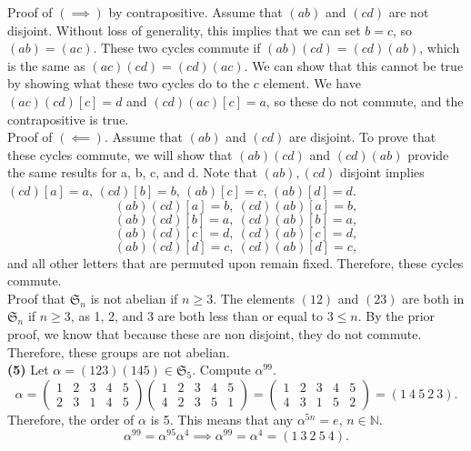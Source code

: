 \documentclass[12pt,letterpaper]{article}
\begin{document}
Proof of \((\implies)\) by contrapositive. Assume that \((ab)\) and \((cd)\) are not disjoint. Without loss of generality, this implies that we can set \(b = c\), so \((ab) = (ac)\). These two cycles commute if \((ab)(cd) = (cd)(ab)\), which is the same as \((ac)(cd) = (cd)(ac)\). We can show that this cannot be true by showing what these two cycles do to the \(c\) element. We have \((ac)(cd)[c] = d\) and \((cd)(ac)[c] = a\), so these do not commute, and the contrapositive is true. \\

Proof of \((\impliedby)\). Assume that \((ab)\) and \((cd)\) are disjoint. To prove that these cycles commute, we will show that \((ab)(cd)\) and \((cd)(ab)\) provide the same results for a, b, c, and d. Note that \((ab),(cd)\) disjoint implies \((cd)[a] = a\), \((cd)[b] = b\), \((ab)[c] = c\), \((ab)[d] = d\). \[(ab)(cd)[a] = b,\ (cd)(ab)[a] = b,\]\[(ab)(cd)[b] = a,\ (cd)(ab)[b] = a,\]\[(ab)(cd)[c] = d,\ (cd)(ab)[c] = d,\]\[(ab)(cd)[d] = c,\ (cd)(ab)[d] = c,\] and all other letters that are permuted upon remain fixed. Therefore, these cycles commute. \\

Proof that \(\mathfrak{S}_{n}\) is not abelian if \(n \geq 3.\) The elements \((12)\) and \((23)\) are both in \(\mathfrak{S}_{n}\) if \(n \geq 3\), as 1, 2, and 3 are both less than or equal to \(3 \leq n\). By the prior proof, we know that because these are non disjoint, they do not commute. Therefore, these groups are not abelian. \\

\textbf{(5)} Let \(\alpha = (123)(145) \in \mathfrak{S}_{5}.\) Compute \(\alpha^{99}\).\\

\[\alpha = \begin{pmatrix} 1 & 2 & 3 & 4 & 5 \\ 2 & 3 & 1 & 4 & 5 \end{pmatrix} \begin{pmatrix} 1 & 2 & 3 & 4 & 5 \\ 4 & 2 & 3 & 5 & 1\end{pmatrix} = \begin{pmatrix} 1 & 2 & 3 & 4 & 5 \\ 4 & 3 & 1 & 5 & 2 \end{pmatrix} = (1\ 4\ 5\ 2\ 3).\] Therefore, the order of \(\alpha\) is 5. This means that any \(\alpha^{5n}=e\), \(n \in \mathbb{N}\). \[\alpha^{99} = \alpha^{95}\alpha^{4} \implies \alpha^{99} = \alpha^{4} = (1\ 3\ 2\ 5\ 4).\]
\end{document}
